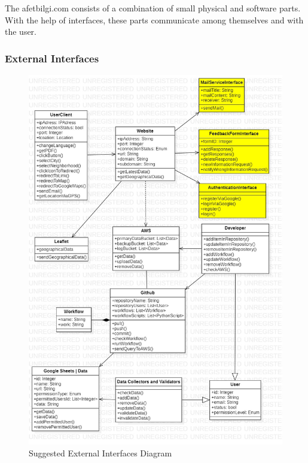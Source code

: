 The afetbilgi.com consists of a combination of small physical and software parts. With the help of interfaces, these parts communicate among themselves and with the user.

\subsubsection{External Interfaces}

\begin{figure}[H]
  \centering
  \includegraphics[width=\linewidth]{img/external-interfaces-diagram-s5.jpg}
  \caption{Suggested External Interfaces Diagram}
\end{figure}

